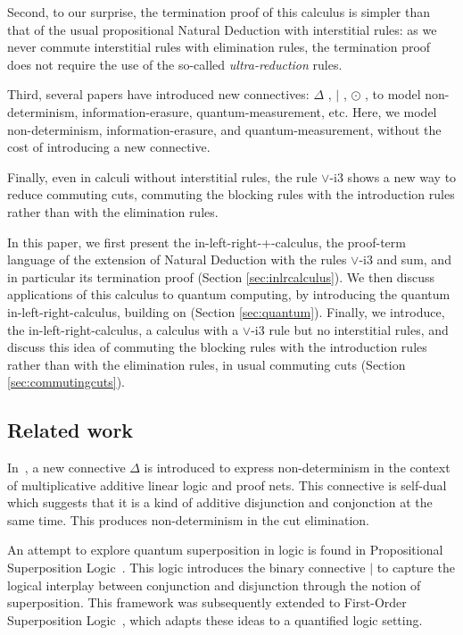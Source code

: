 \documentclass[screen, sigconf,authorversion,nonacm]{acmart}
\theoremstyle{acmdefinition}
\numberwithin{equation}{section}
\begin{document}
Second, to our surprise, the termination proof of this calculus is
simpler than that of the usual propositional Natural Deduction with
interstitial rules: as we never commute interstitial rules with
elimination rules, the termination proof does not require the use of
the so-called {\it ultra-reduction} rules.

Third, several papers have introduced new connectives: $\Delta$
\cite{SatoshiIPSJ96}, $|$ \cite{TzouvarasIGPL17, TzouvarasIGPL19},
$\odot$ \cite{DiazcaroDowekTCS23}, to model non-determinism,
information-erasure, quantum-measurement, etc. Here, we model
non-determinism, \linebreak information-erasure, and
quantum-measurement, without the cost of introducing a new connective.

Finally, even in calculi without interstitial rules, the rule
$\vee$-i3 shows a new way to reduce commuting cuts, commuting the
blocking rules with the introduction rules rather than with the
elimination rules.

In this paper, we first present the in-left-right-+-calculus, the
proof-term language of the extension of Natural Deduction with the
rules $\vee$-i3 and sum, and in particular its termination proof
(Section \ref{sec:inlrcalculus}).  We then discuss applications of
this calculus to quantum computing, by introducing the quantum in-left-right-calculus, building on
\cite{DiazcaroDowekTCS23,DiazcaroDowekMSCS24} (Section
\ref{sec:quantum}).  Finally, we introduce, the
in-left-right-calculus, a calculus with a $\vee$-i3 rule but no
interstitial rules, and discuss this idea of commuting the blocking
rules with the introduction rules rather than with the elimination
rules, in usual commuting cuts (Section \ref{sec:commutingcuts}).

\subsection*{Related work}

In~\cite{SatoshiIPSJ96}, a new connective $\Delta$ is introduced to
express non-deter\-min\-ism in the context of multiplicative additive
linear logic and proof nets. This connective is self-dual which
suggests that it is a kind of additive disjunction and conjonction at
the same time. This produces non-determinism in the cut elimination.

An attempt to explore quantum superposition in logic is found in
Propositional Superposition Logic~\cite{TzouvarasIGPL17}. This logic
introduces the binary connective $|$ to capture the logical interplay
between conjunction and disjunction through the notion of
superposition. This framework was subsequently extended to First-Order
Superposition Logic~\cite{TzouvarasIGPL19}, which adapts these
ideas to a quantified logic setting.
\end{document}
